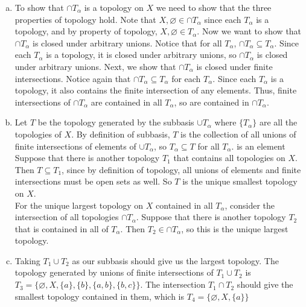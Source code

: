 \documentclass[12pt]{article}
\newenvironment{solution}[1][Solution]
{
	\begin{trivlist} 
		\item[\hskip \labelsep {\itshape #1:}]
	}
	{
	\end{trivlist}
}
\begin{document}
\begin{solution}
	\hfill
	\begin{enumerate}[(a)]
		\item To show that $\cap T_\alpha$ is a topology on $X$ we need to show that the three properties of topology hold. Note that $X, \varnothing \in \cap T_\alpha$ since each $T_\alpha$ is a topology, and by property of topology, $X, \varnothing \in T_\alpha$. Now we want to show that $\cap T_\alpha$ is closed under arbitrary unions. Notice that for all $T_\alpha$, $\cap T_\alpha \subseteq T_\alpha$.  Since each $T_\alpha$ is a topology, it is closed under arbitrary unions, so $\cap T_\alpha$ is closed under arbitrary unions. Next, we show that $\cap T_\alpha$ is closed under finite intersections. Notice again that $\cap T_\alpha \subseteq T_\alpha$ for each $T_\alpha$. Since each $T_\alpha$ is a topology, it also contains the finite intersection of any elements. Thus, finite intersections of $\cap T_\alpha$ are contained in all $T_\alpha$, so are contained in $\cap T_\alpha$. 
		\item Let $T$ be the topology generated by the subbasis $\cup T_\alpha$ where $\lbrace{T_\alpha\rbrace}$ are all the topologies of $X$. By definition of subbasis, $T$ is the collection of all unions of finite intersections of elements of $\cup T_\alpha$, so $T_\alpha \subseteq T$ for all $T_\alpha$. is an element  Suppose that there is another topology $T_1$ that contains all topologies on $X$. Then $T \subseteq T_1$, since by definition of topology, all unions of elements and finite intersections must be open sets as well. So $T$ is the unique smallest topology on $X$. \\
		For the unique largest topology on $X$ contained in all $T_\alpha$, consider the intersection of all topologies $\cap T_\alpha$. Suppose that there is another topology $T_2$ that is contained in all of $T_\alpha$. Then $T_2 \in \cap T_\alpha$, so this is the unique largest topology. 
		\item Taking $T_1 \cup T_2$ as our subbasis should give us the largest topology. The topology generated by unions of finite intersections of $T_1 \cup T_2$ is $T_3 = \lbrace{\varnothing, X , \lbrace{a\rbrace}, \lbrace{b\rbrace}, \lbrace{a,b\rbrace},\lbrace{b,c\rbrace}\rbrace}$. The intersection $T_1 \cap T_2$ should give the smallest topology contained in them, which is $T_4 = \lbrace{\varnothing, X, \lbrace{a\rbrace}\rbrace}$
		
	\end{enumerate}
	
\end{solution}
\end{document}
